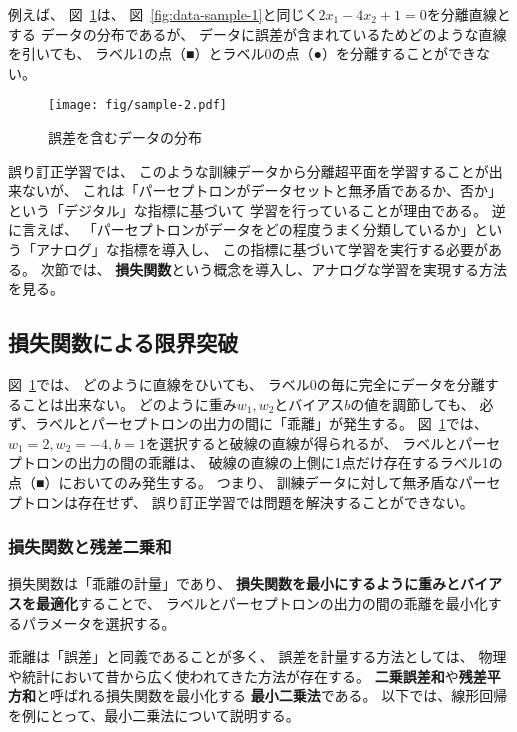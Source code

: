 例えば、
図~\ref{fig:with-errors}は、
図~\ref{fig:data-sample-1}と同じく$2x_1 - 4x_2 + 1 = 0$を分離直線とする
データの分布であるが、
データに誤差が含まれているためどのような直線を引いても、
ラベル1の点（■）とラベル0の点（●）を分離することができない。

\begin{figure}
  \centering
  \texttt{[image: fig/sample-2.pdf]}
  \caption{誤差を含むデータの分布}
  \label{fig:with-errors}
\end{figure}

誤り訂正学習では、
このような訓練データから分離超平面を学習することが出来ないが、
これは「パーセプトロンがデータセットと無矛盾であるか、否か」という「デジタル」な指標に基づいて
学習を行っていることが理由である。
逆に言えば、
「パーセプトロンがデータをどの程度うまく分類しているか」という「アナログ」な指標を導入し、
この指標に基づいて学習を実行する必要がある。
次節では、
\textbf{損失関数}という概念を導入し、アナログな学習を実現する方法を見る。

\subsection{損失関数による限界突破}
\label{sec:loss-function}

図~\ref{fig:with-errors}では、
どのように直線をひいても、
ラベル0の毎に完全にデータを分離することは出来ない。
どのように重み$w_1, w_2$とバイアス$b$の値を調節しても、
必ず、ラベルとパーセプトロンの出力の間に「乖離」が発生する。
図~\ref{fig:with-errors}では、
$w_1 = 2, w_2 = -4, b = 1$を選択すると破線の直線が得られるが、
ラベルとパーセプトロンの出力の間の乖離は、
破線の直線の上側に1点だけ存在するラベル1の点（■）においてのみ発生する。
つまり、
訓練データに対して無矛盾なパーセプトロンは存在せず、
誤り訂正学習では問題を解決することができない。

\subsubsection{損失関数と残差二乗和}
\label{sec:loss-function-intro}

損失関数は「乖離の計量」であり、
\textbf{損失関数を最小にするように重みとバイアスを最適化}することで、
ラベルとパーセプトロンの出力の間の乖離を最小化するパラメータを選択する。

乖離は「誤差」と同義であることが多く、
誤差を計量する方法としては、
物理や統計において昔から広く使われてきた方法が存在する。
\textbf{二乗誤差和}や\textbf{残差平方和}と呼ばれる損失関数を最小化する
\textbf{最小二乗法}である。
以下では、線形回帰を例にとって、最小二乗法について説明する。


